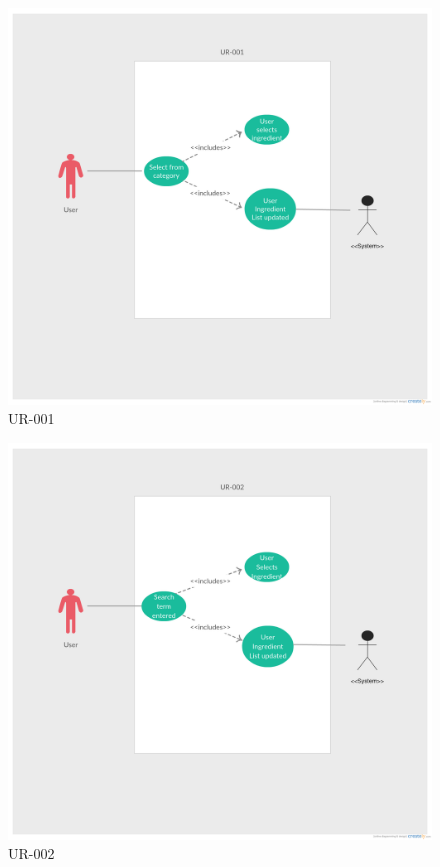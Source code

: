 \documentclass[12pt]{article}
\begin{document}
 \newpage
 \begin{figure}
   \includegraphics[width=\linewidth]{UR-001.png}
   \caption{UR-001}
   \label{fig:UR-001}
 \end{figure}
 \newpage
 \begin{figure}
   \includegraphics[width=\linewidth]{UR-002.png}
   \caption{UR-002}
   \label{fig:UR-002}
 \end{figure}
 \newpage
\end{document}
